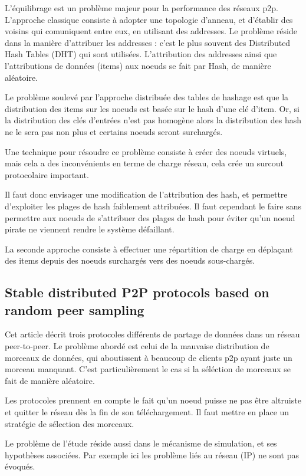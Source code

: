 \documentclass{article}
\begin{document}
L'équilibrage est un problème majeur pour la performance des réseaux p2p. L'approche classique consiste à adopter
une topologie d'anneau, et d'établir des voisins qui comuniquent entre eux, en utilisant des addresses. Le problème
réside dans la manière d'attribuer les addresses : c'est le plus souvent des Distributed Hash Tables (DHT) qui sont utilisées. L'attribution des addresses ainsi que l'attributions de données (items) aux noeuds se fait par Hash, de
manière aléatoire.

Le problème soulevé par l'approche distribuée des tables de hashage est que la distribution des items sur les noeuds
est basée sur le hash d'une clé d'item. Or, si la distribution des clés d'entrées n'est pas homogène alors la
distribution des hash ne le sera pas non plus et certains noeuds seront surchargés.

Une technique pour résoudre ce problème consiste à créer des noeuds virtuels, mais cela a des inconvénients en terme de charge réseau, cela crée un surcout protocolaire important.

Il faut donc envisager une modification de l'attribution des hash, et permettre d'exploiter les plages de hash
faiblement attribuées. Il faut cependant le faire sans permettre aux noeuds de s'attribuer des plages de hash
pour éviter qu'un noeud pirate ne viennent rendre le système défaillant.

La seconde approche consiste à effectuer une répartition de charge en déplaçant des items depuis des noeuds surchargés vers des noeuds sous-chargés.

\subsection{Stable distributed P2P protocols based on random peer sampling
\cite{6858091}
}

Cet article décrit trois protocoles différents de partage de données dans un réseau peer-to-peer. Le problème
abordé est celui de la mauvaise distribution de morceaux de données, qui aboutissent à beaucoup de clients p2p
ayant juste un morceau manquant. C'est particulièrement le cas si la séléction de morceaux se fait de manière
aléatoire.

Les protocoles prennent en compte le fait qu'un noeud puisse ne pas être altruiste et quitter le réseau dès la
fin de son téléchargement. Il faut mettre en place un stratégie de sélection des morceaux.

Le problème de l'étude réside aussi dans le mécanisme de simulation, et ses hypothèses associées. Par
exemple ici les problème liés au réseau (IP) ne sont pas évoqués.
\end{document}
